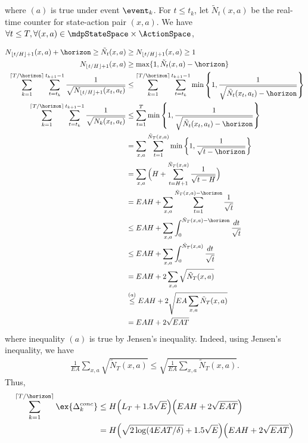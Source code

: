             where $(a)$ is true under event $\event_k$.
            For $t\le t_k$, let $\tilde{N}_t(x,a)$ be the real-time counter for state-action pair $(x,a)$. We have $\forall t\le T, \forall (x,a)\in \mdpStateSpace\times\ActionSpace$,
            
            \begin{align*}
                N_{\lfloor t/H\rfloor+1}(x,a) +\horizon \ge \tilde{N}_t(x,a) &\ge N_{\lfloor t/H\rfloor+1}(x,a) \ge 1 \\
                N_{\lfloor t/H\rfloor+1}(x,a) &\ge \max\{1, \tilde{N}_t(x,a) -\horizon\} \\
                \sum_{k=1}^{\lceil T/\horizon\rceil} \sum_{t=t_k}^{t_{k+1}-1} \frac{1}{\sqrt{N_{\lfloor t/H\rfloor+1}(x_t,a_t)}} &\le \sum_{k=1}^{\lceil T/\horizon\rceil} \sum_{t=t_k}^{t_{k+1}-1} \min\left\{1, \frac{1}{\sqrt{\tilde{N}_t(x_t,a_t) -\horizon}}\right\} \\
                \sum_{k=1}^{\lceil T/\horizon\rceil} \sum_{t=t_k}^{t_{k+1}-1} \frac{1}{\sqrt{N_k(x_t,a_t)}} &\le \sum_{t=1}^{T} \min\left\{1, \frac{1}{\sqrt{\tilde{N}_t(x_t,a_t) -\horizon}}\right\} \\
                &= \sum_{x,a} \sum_{t=1}^{\tilde{N}_T(x,a)} \min\left\{1, \frac{1}{\sqrt{t -\horizon}}\right\} \\
                &= \sum_{x,a} \Big(H +\sum_{t=H+1}^{\tilde{N}_T(x,a)} \frac{1}{\sqrt{t -H}}\Big) \\
                &= EAH +\sum_{x,a} \sum_{t=1}^{\tilde{N}_T(x,a) -\horizon} \frac{1}{\sqrt{t}} \\
                &\le EAH +\sum_{x,a} \int_0^{\tilde{N}_T(x,a) -\horizon} \frac{dt}{\sqrt{t}} \\
                &\le EAH +\sum_{x,a} \int_0^{\tilde{N}_T(x,a)} \frac{dt}{\sqrt{t}} \\
                &= EAH +2\sum_{x,a} \sqrt{\tilde{N}_T(x,a)} \\
                &\overset{(a)}\le EAH +2\sqrt{EA \sum_{x,a}\tilde{N}_T(x,a)} \\
                &= EAH +2\sqrt{EAT}
            \end{align*}
            where inequality $(a)$ is true by Jensen's inequality. Indeed, using Jensen's inequality, we have
            \begin{align*}
                \frac{1}{EA}\sum_{x,a}\sqrt{\tilde{N}_T(x,a)} \le\sqrt{\frac{1}{EA}\sum_{x,a}\tilde{N}_T(x,a)}.
            \end{align*}
            Thus,
            \begin{align*}
                \sum_{k=1}^{\lceil T/\horizon\rceil}\ex{\Delta_k^{conc}}
                &\le H\Big(L_T+1.5\sqrt{E}\Big) \Big(EAH +2\sqrt{EAT}\Big) \\
                &= H\Big(\sqrt{2\log(4EAT/\delta)} +1.5\sqrt{E}\Big) \Big(EAH +2\sqrt{EAT}\Big)
            \end{align*}
